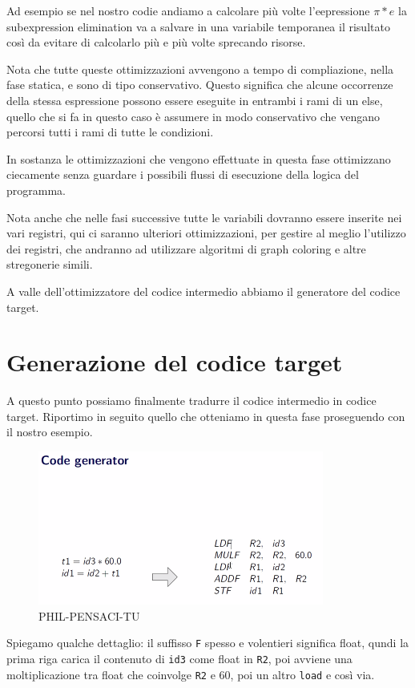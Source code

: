 \documentclass[class=book, crop=false, oneside, 12pt]{standalone}
\begin{document}
Ad esempio se nel nostro codie andiamo a calcolare più volte l'eepressione \(\pi * e\) la subexpression elimination va a salvare in una variabile temporanea il risultato così da evitare di calcolarlo più e più volte sprecando risorse.

Nota che tutte queste ottimizzazioni avvengono a tempo di compliazione, nella fase statica, e sono di tipo conservativo. Questo significa che alcune occorrenze della stessa espressione possono essere eseguite in entrambi i rami di un else, quello che si fa in questo caso è assumere in modo conservativo che vengano percorsi tutti i rami di tutte le condizioni.

In sostanza le ottimizzazioni che vengono effettuate in questa fase ottimizzano ciecamente senza guardare i possibili flussi di esecuzione della logica del programma.

Nota anche che nelle fasi successive tutte le variabili dovranno essere inserite nei vari registri, qui ci saranno ulteriori ottimizzazioni, per gestire al meglio l'utilizzo dei registri, che andranno ad utilizzare algoritmi di graph coloring e altre stregonerie simili.

A valle dell'ottimizzatore del codice intermedio abbiamo il generatore del codice target.

\section{Generazione del codice target}
A questo punto possiamo finalmente tradurre il codice intermedio in codice target. Riportimo in seguito quello che otteniamo in questa fase proseguendo con il nostro esempio.
\begin{figure}[H]
    \centering
    \includegraphics[width=.4\textwidth]{final-example-target-code.png}
    \caption{PHIL-PENSACI-TU}
    \label{fig:PHIL-PENSACI-TU}
\end{figure}
Spiegamo qualche dettaglio: il suffisso \texttt{F} spesso e volentieri significa float, qundi la prima riga carica il contenuto di \texttt{id3} come float in \texttt{R2}, poi avviene una moltiplicazione tra float che coinvolge \texttt{R2} e \(60\), poi un altro \texttt{load} e così via.
\end{document}
